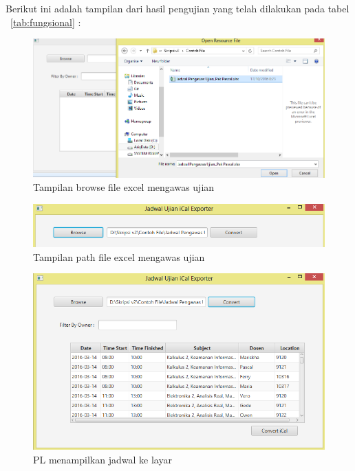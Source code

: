 Berikut ini adalah tampilan dari hasil pengujian yang telah dilakukan pada tabel ~\ref{tab:fungsional} :

		\begin{figure}[H]
		\centering
		\includegraphics[scale=0.7]{Gambar/browseFile}
		\caption{Tampilan browse file excel mengawas ujian}
		\label{fig:browseFile}
		\end{figure}

		\begin{figure}[H]
		\centering
		\includegraphics[scale=0.8]{Gambar/pathFile}
		\caption{Tampilan path file excel mengawas ujian}
		\label{fig:pathFile}
		\end{figure}

		\begin{figure}[H]
		\centering
		\includegraphics[scale=0.7]{Gambar/implementAntarmuka2}
		\caption{PL menampilkan jadwal ke layar}
		\label{fig:jadwalKeLayar}
		\end{figure}

